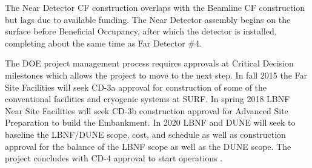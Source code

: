 The Near Detector CF construction overlaps with the Beamline CF construction but lags due to available funding. The Near Detector assembly begins on the surface before Beneficial Occupancy, after which the detector is installed, completing about the same time as Far Detector \#4. 

The DOE project management process requires approvals at Critical Decision milestones which allows the project to move to the next step. In fall 2015 the Far Site Facilities will seek CD-3a approval for construction of some of the conventional facilities and cryogenic systems at SURF. In spring 2018 LBNF Near Site Facilities will seek CD-3b construction approval for Advanced Site Preparation to build the Embankment. In 2020 LBNF and DUNE will seek to baseline the LBNF/DUNE scope, cost, and schedule as well as construction approval for the balance of the LBNF scope as well as the DUNE scope. The project concludes with CD-4 approval to start operations . 

